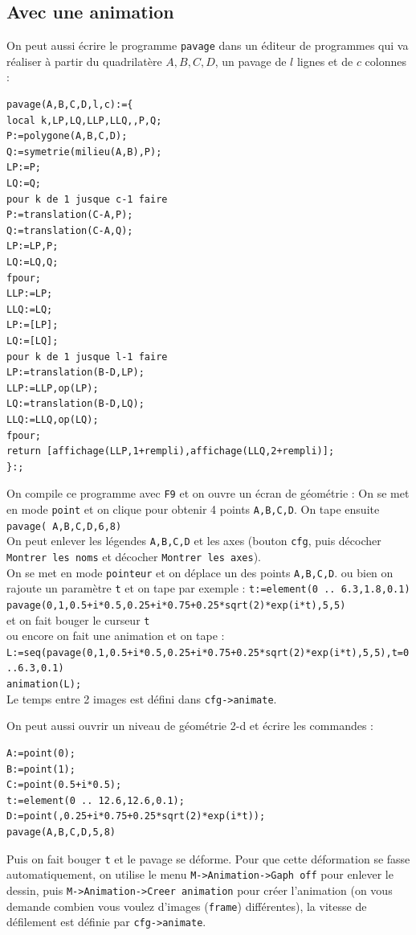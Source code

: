 \documentclass[a4paper,11pt]{book}
\begin{document}
\subsection{Avec une animation}
On peut aussi \'ecrire le programme {\tt pavage} dans un \'editeur de 
programmes qui va r\'ealiser \`a partir du quadrilat\`ere $A,B,C,D$, un pavage 
de $l$ lignes et de $c$ colonnes :
\begin{verbatim}
pavage(A,B,C,D,l,c):={
local k,LP,LQ,LLP,LLQ,,P,Q;
P:=polygone(A,B,C,D);
Q:=symetrie(milieu(A,B),P);
LP:=P;
LQ:=Q;
pour k de 1 jusque c-1 faire 
P:=translation(C-A,P);
Q:=translation(C-A,Q);
LP:=LP,P;
LQ:=LQ,Q;
fpour;
LLP:=LP;
LLQ:=LQ;
LP:=[LP];
LQ:=[LQ];
pour k de 1 jusque l-1 faire 
LP:=translation(B-D,LP);
LLP:=LLP,op(LP);
LQ:=translation(B-D,LQ);
LLQ:=LLQ,op(LQ);
fpour;
return [affichage(LLP,1+rempli),affichage(LLQ,2+rempli)];
}:;
\end{verbatim}  
On compile ce programme avec {\tt F9} et on ouvre un \'ecran de g\'eom\'etrie :
On se met en mode {\tt point} et on clique pour obtenir 4 points {\tt A,B,C,D}.
On tape ensuite {\tt pavage( A,B,C,D,6,8)}\\
On peut enlever les l\'egendes  {\tt A,B,C,D} et les axes (bouton {\tt cfg}, 
puis d\'ecocher {\tt Montrer les noms} et d\'ecocher {\tt Montrer les axes}).\\
On se met en mode {\tt pointeur} et on d\'eplace un des points {\tt A,B,C,D}.
ou bien on rajoute un param\`etre {\tt t} et on tape par exemple :
{\tt t:=element(0 .. 6.3,1.8,0.1)}\\
{\tt pavage(0,1,0.5+i*0.5,0.25+i*0.75+0.25*sqrt(2)*exp(i*t),5,5)}\\
et on fait bouger le curseur {\tt t}\\
ou encore on fait une animation et on tape :\\
{\tt L:=seq(pavage(0,1,0.5+i*0.5,0.25+i*0.75+0.25*sqrt(2)*exp(i*t),5,5),t=0..6.3,0.1)}\\
{\tt animation(L);}\\
Le temps entre 2 images est d\'efini dans {\tt cfg->animate}.

On peut aussi ouvrir un niveau de g\'eom\'etrie 2-d et \'ecrire les commandes :
\begin{verbatim}
A:=point(0);
B:=point(1);
C:=point(0.5+i*0.5);
t:=element(0 .. 12.6,12.6,0.1);
D:=point(,0.25+i*0.75+0.25*sqrt(2)*exp(i*t));
pavage(A,B,C,D,5,8)
\end{verbatim}  
Puis on fait bouger {\tt t} et le pavage se d\'eforme. Pour que cette 
d\'eformation se fasse automatiquement, on utilise le menu 
{\tt M->Animation->Gaph off} pour enlever le dessin, puis 
{\tt M->Animation->Creer animation} pour cr\'eer l'animation (on vous demande 
combien vous voulez d'images ({\tt frame}) diff\'erentes), la vitesse de 
d\'efilement est d\'efinie par {\tt cfg->animate}.
\end{document}
